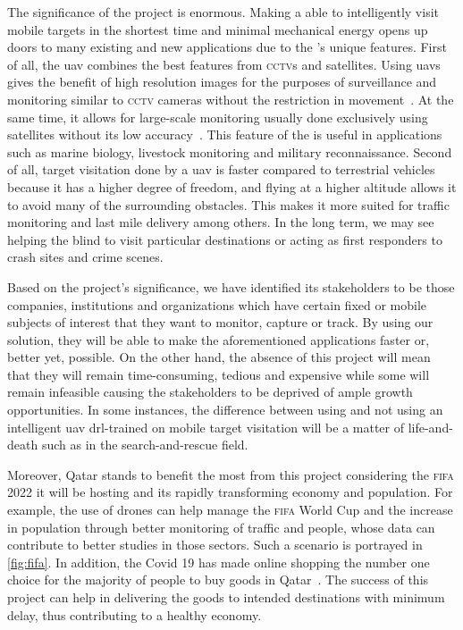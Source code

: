 \documentclass[../main.tex]{subfiles}
\begin{document}
The significance of the project is enormous. 
Making a \uav able to intelligently 
visit mobile targets in the shortest time
and minimal mechanical energy 
opens up doors to many existing and new applications
due to the \uav's unique features.
First of all, the \gls{uav} combines the best features
from \textsc{cctv}s and satellites.
Using \glspl{uav} gives the benefit of high resolution images
for the purposes of surveillance and monitoring
similar to \textsc{cctv} cameras 
without the restriction in movement~\cite{Sha19}.
At the same time, it allows for large-scale monitoring 
usually done exclusively using satellites 
without its low accuracy~\cite{Sha19}.
This feature of the \uav is useful in applications
such as marine biology, livestock monitoring and military
reconnaissance.
Second of all, target visitation done by a \gls{uav}
is faster compared to terrestrial vehicles
because it has a higher degree of freedom, and
flying at a higher altitude 
allows it to avoid 
many of the surrounding obstacles.
This makes it more suited for traffic monitoring and last mile delivery
among others. In the long term, we may see \uavs helping the
blind to visit particular destinations or acting as first
responders to crash sites and crime scenes.

Based on the project's significance, we have identified 
its stakeholders to be 
those companies, institutions and organizations which
have certain fixed or mobile subjects of interest 
that they want to monitor, capture or track.
By using our solution,
they will be able to make the aforementioned applications
faster or,
better yet, possible.
On the other hand, the absence of this project will mean that
they will remain
time-consuming, tedious and expensive
while some will remain infeasible
causing the stakeholders to be deprived of ample growth opportunities.
In some instances, the difference between using 
and not using an intelligent \gls{uav} 
\gls{drl}-trained on mobile target visitation
will be a matter of life-and-death
such as in the search-and-rescue field.

Moreover, Qatar stands to benefit the most from this project 
considering the \textsc{fifa} 2022 it will be hosting
and its rapidly transforming economy and population.
For example, the use of drones can help manage 
the \textsc{fifa} World Cup 
and the increase in population through better monitoring 
of traffic and people, whose data can contribute
to better studies in those sectors. Such a scenario 
is portrayed in \cref{fig:fifa}.
In addition, the Covid 19 has made online shopping
the number one choice for 
the majority of people to buy goods in Qatar~\cite{Has20}.
The success of this project can help in delivering
the goods to intended destinations with minimum delay,
thus contributing to a healthy economy.
\end{document}
